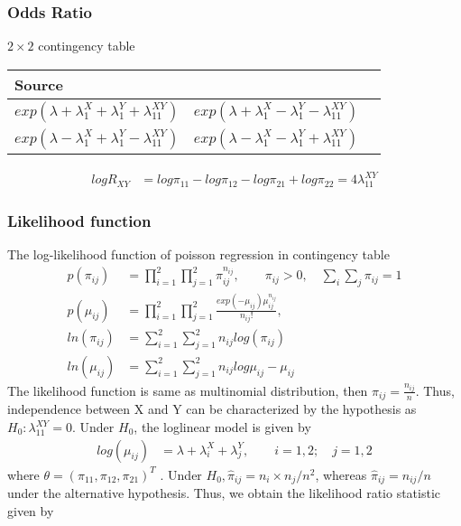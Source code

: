  \subsubsection{Odds Ratio} 

$2 \times 2$ contingency table\\
\begin{tabular}{l r r}
Source & &   \\\hline
$exp(\lambda + \lambda_1^X + \lambda_1^Y + \lambda_{11}^{XY})$ & $exp(\lambda + \lambda_1^X - \lambda_1^Y - \lambda_{11}^{XY})$ \\
$exp(\lambda - \lambda_1^X + \lambda_1^Y - \lambda_{11}^{XY})$ & $exp(\lambda - \lambda_1^X - \lambda_1^Y + \lambda_{11}^{XY})$ \\
\hline
\end{tabular}
 \begin{align*}
   log R_{XY} &= log \pi_{11} - log \pi_{12} - log \pi_{21} + log \pi_{22} = 4 \lambda_{11}^{XY}
\end{align*}

 \subsubsection{Likelihood function} 
The log-likelihood function of poisson regression in contingency table
\begin{align*}
	p(\pi_{ij}) &= \prod_{i=1}^2 \prod_{j=1}^2 \pi_{ij}^{n_{ij}}, \qquad \pi_{ij} >0, \quad \sum_{i}\sum_{j} \pi_{ij} = 1 \\
	p(\mu_{ij}) &= \prod_{i=1}^2 \prod_{j=1}^2 \frac{exp(-\mu_{ij}) \mu_{ij}^{n_{ij}}}{n_{ij}!},  \\
	ln(\pi_{ij}) & = \sum_{i=1}^2  \sum_{j=1}^2 n_{ij} log (\pi_{ij})\\
	ln(\mu_{ij}) & = \sum_{i=1}^2  \sum_{j=1}^2 n_{ij} log \mu_{ij} - \mu_{ij}
\end{align*}
The likelihood function is same as multinomial distribution, then $\pi_{ij}= \frac{n_{ij}}{n}$. 
Thus, independence between X and Y can be characterized by the hypothesis as $H_0 : \lambda^{XY}_{11} = 0$. Under $H_0$, the loglinear model is given by
\begin{align*}
log (\mu_{ij}) &= \lambda + \lambda_i^X + \lambda_j^Y, \qquad i=1,2; \quad j=1,2
\end{align*}
where $\theta = (\pi_{11}, \pi_{12}, \pi_{21})^T$ . Under $H_0, \hat{\pi}_{ij} = n_i \times n_j/n^2$, whereas $ \hat{\pi}_{ij} = n_{ij}/n$ under the alternative hypothesis. Thus, we obtain the likelihood ratio statistic given by

